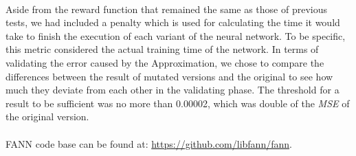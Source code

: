 ~\\
Aside from the reward function that remained the same as those of previous tests, we had included a penalty which is used for calculating the time it would take to finish the execution of each variant of the neural network. To be specific, this metric considered the actual training time of the network. In terms of validating the error caused by the Approximation, we chose to compare the differences between the result of mutated versions and the original to see how much they deviate from each other in the validating phase. The threshold for a result to be sufficient was no more than 0.00002, which was double of the \textit{MSE} of the original version.\\
~\\ 
FANN code base can be found at: \url{https://github.com/libfann/fann}.\\